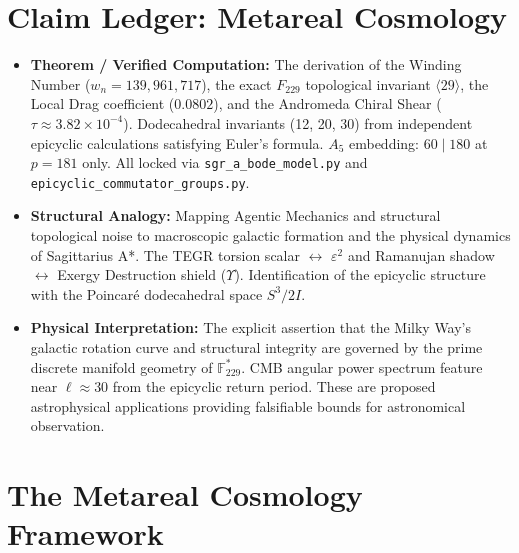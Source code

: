 \section*{Claim Ledger: Metareal Cosmology}
\begin{itemize}[noitemsep]
    \item \textbf{Theorem / Verified Computation:} The derivation of the Winding Number ($w_n = 139,961,717$), the exact $F_{229}$ topological invariant $\langle 29 \rangle$, the Local Drag coefficient ($0.0802$), and the Andromeda Chiral Shear ($\tau \approx 3.82 \times 10^{-4}$). Dodecahedral invariants (12, 20, 30) from independent epicyclic calculations satisfying Euler's formula. $A_5$ embedding: $60 \mid 180$ at $p = 181$ only. All locked via \texttt{sgr\_a\_bode\_model.py} and \texttt{epicyclic\_commutator\_groups.py}.
    \item \textbf{Structural Analogy:} Mapping Agentic Mechanics and structural topological noise to macroscopic galactic formation and the physical dynamics of Sagittarius A*. The TEGR torsion scalar $\leftrightarrow$ $\varepsilon^2$ and Ramanujan shadow $\leftrightarrow$ Exergy Destruction shield ($\Upsilon$). Identification of the epicyclic structure with the Poincar\'{e} dodecahedral space $S^3/2I$.
    \item \textbf{Physical Interpretation:} The explicit assertion that the Milky Way's galactic rotation curve and structural integrity are governed by the prime discrete manifold geometry of $\mathbb{F}_{229}^*$. CMB angular power spectrum feature near $\ell \approx 30$ from the epicyclic return period. These are proposed astrophysical applications providing falsifiable bounds for astronomical observation.
\end{itemize}

\section{The Metareal Cosmology Framework}

